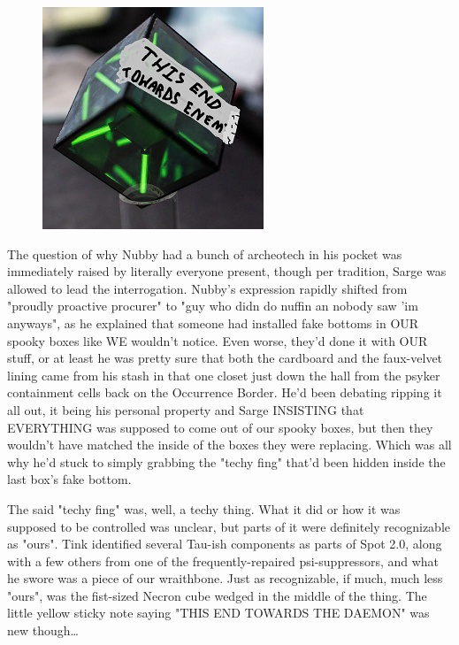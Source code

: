 \begin{figure}
	\begin{center}
		\includegraphics[width=\figwidth]{pics/21/119.png}
	\end{center}
\end{figure}
The question of why Nubby had a bunch of archeotech in his pocket was immediately raised by literally everyone present, though per tradition, Sarge was allowed to lead the interrogation. 
Nubby's expression rapidly shifted from "proudly proactive procurer" to "guy who didn do nuffin an nobody saw 'im anyways", as he explained that someone had installed fake bottoms in OUR spooky boxes like WE wouldn't notice. 
Even worse, they'd done it with OUR stuff, or at least he was pretty sure that both the cardboard and the faux-velvet lining came from his stash in that one closet just down the hall from the psyker containment cells back on the Occurrence Border. 
He'd been debating ripping it all out, it being his personal property and Sarge INSISTING that EVERYTHING was supposed to come out of our spooky boxes, but then they wouldn't have matched the inside of the boxes they were replacing. 
Which was all why he'd stuck to simply grabbing the "techy fing" that'd been hidden inside the last box's fake bottom.

The said "techy fing" was, well, a techy thing. 
What it did or how it was supposed to be controlled was unclear, but parts of it were definitely recognizable as "ours". 
Tink identified several Tau-ish components as parts of Spot 2.0, along with a few others from one of the frequently-repaired psi-suppressors, and what he swore was a piece of our wraithbone. 
Just as recognizable, if much, much less "ours", was the fist-sized Necron cube wedged in the middle of the thing. 
The little yellow sticky note saying "THIS END TOWARDS THE DAEMON" was new though…

